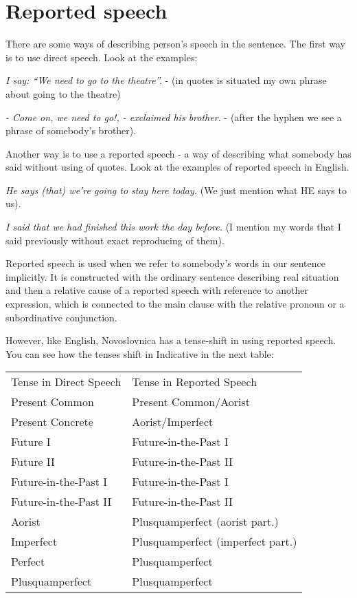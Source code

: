 \section{Reported speech}

There are some ways of describing person’s speech in the sentence. The first way is to use direct speech. Look at the examples:

\textit{I say: “We need to go to the theatre”.} - (in quotes is situated my own phrase about going to the theatre)

\textit{- Come on, we need to go!, - exclaimed his brother.} - (after the hyphen we see a phrase of somebody’s brother).

Another way is to use a reported speech - a way of describing what somebody has said without using of quotes. Look at the examples of reported speech in English.

\textit{He says (that) we’re going to stay here today.} (We just mention what HE says to us).

\textit{I said that we had finished this work the day before.} (I mention my words that I said previously without exact reproducing of them).

Reported speech is used when we refer to somebody’s words in our sentence implicitly. It is constructed with the ordinary sentence describing real situation and then a relative cause of a reported speech with reference to another expression, which is connected to the main clause with the relative pronoun or a subordinative conjunction.

However, like English, Novoslovnica has a tense-shift in using reported speech. You can see how the tenses shift in Indicative in the next table:

\begin{table}
	\begin{tabular}{ll}
		Tense in Direct Speech & Tense in Reported Speech \\
		Present Common & Present Common/Aorist \\
		Present Concrete & Aorist/Imperfect \\
		Future I & Future-in-the-Past I \\
		Future II & Future-in-the-Past II \\
		Future-in-the-Past I & Future-in-the-Past I \\
		Future-in-the-Past II & Future-in-the-Past II \\
		Aorist & Plusquamperfect (aorist part.) \\
		Imperfect & Plusquamperfect (imperfect part.) \\
		Perfect & Plusquamperfect \\
		Plusquamperfect & Plusquamperfect 
	\end{tabular}
\end{table}


